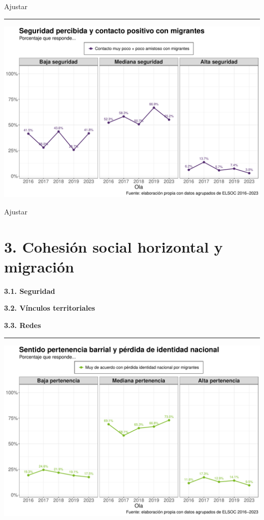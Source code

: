 \documentclass[
  spanish,
  letterpaper,
  DIV=11,
  numbers=noendperiod,
  oneside]{scrartcl}
\begin{document}
Ajustar

\begin{center}\rule{0.5\linewidth}{0.5pt}\end{center}

\begin{center}
\includegraphics[width=1\linewidth,height=\textheight,keepaspectratio]{cep_2025_files/figure-pdf/unnamed-chunk-6-1.pdf}
\end{center}

Ajustar

\section{3. Cohesión social horizontal y
migración}\label{cohesiuxf3n-social-horizontal-y-migraciuxf3n-2}

{\textbf{3.1. Seguridad}}

{\textbf{3.2. Vínculos territoriales}}

{\textbf{3.3. Redes}}

\begin{center}\rule{0.5\linewidth}{0.5pt}\end{center}

\begin{center}
\includegraphics[width=1\linewidth,height=\textheight,keepaspectratio]{cep_2025_files/figure-pdf/unnamed-chunk-7-1.pdf}
\end{center}
\end{document}
